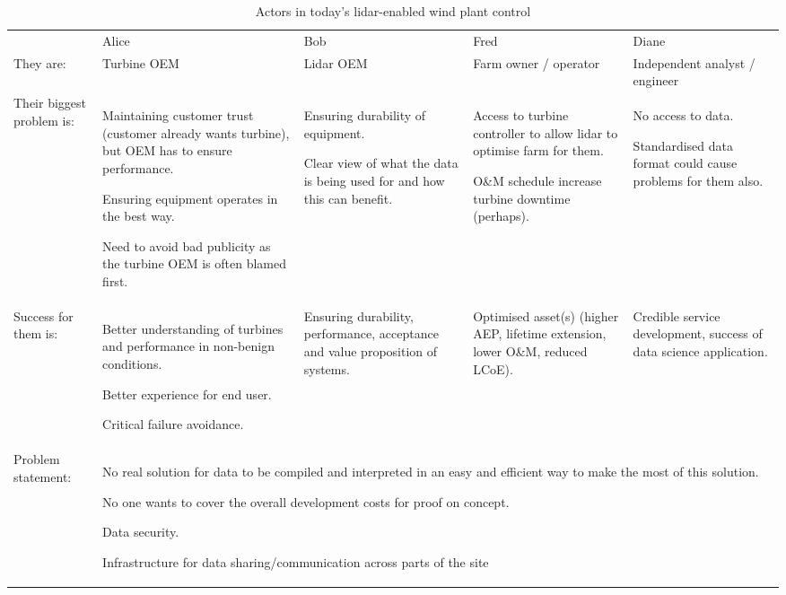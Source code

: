 \begin{table*}[!h]
    \centering
    \caption{Actors in today's lidar-enabled wind plant control}
    \begin{tabular}{@{}|p{}|p{}|p{}|p{}|p{}|@{}}
    \rowcolor{Task32Blue2} & 
        Alice &
        Bob & 
        Fred & 
        Diane \\
They are: & 
    Turbine OEM & 
    Lidar OEM & 
    Farm owner / operator &
    Independent analyst / engineer \\
Their biggest problem is: &
    Maintaining customer trust (customer already wants turbine), but OEM has to ensure performance. 
    
    Ensuring equipment operates in the best way.
    
    Need to avoid bad publicity as the turbine OEM is often blamed first. & 
    Ensuring durability of equipment.

    Clear view of what the data is being used for and how this can benefit. &
    Access to turbine controller to allow lidar to optimise farm for them.
    
    O\&M schedule increase turbine downtime (perhaps). &     
    No access to data.
    
    Standardised data format could cause problems for them also. \\
Success for them is: & 
    Better understanding of turbines and performance in non-benign conditions. 
    
    Better experience for end user. 
    
    Critical failure avoidance. &
    Ensuring durability, performance, acceptance and value proposition of systems. & 
    Optimised asset(s) (higher AEP, lifetime extension, lower O\&M, reduced LCoE). &
    Credible service development, success of data science application. \\
Problem statement: &
\multicolumn{4}{p{0.74\textwidth+6\tabcolsep+3\arrayrulewidth}}{No real solution for data to be compiled and interpreted in an easy and efficient way to make the most of this solution.

	No one wants to cover the overall development costs for proof on concept.

	Data security.

	Infrastructure for data sharing/communication across parts of the site} \\
\end{tabular}
\label{tab:03_windPlantControl_now}
\end{table*}


